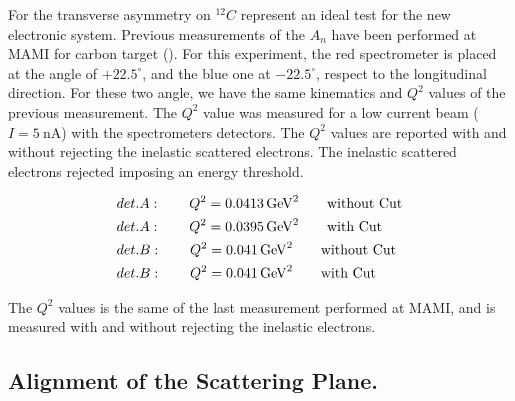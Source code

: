 For the transverse asymmetry on $^{12}C$ represent an ideal test for the new electronic system. Previous measurements of the $A_{n}$ have been performed at MAMI for carbon target (\cite{Esser:2018vdp}). For this experiment, the red spectrometer is placed at the angle of $+22.5^{\circ}$, and the blue one at $-22.5^{\circ}$, respect to the longitudinal direction.
For these two angle, we have the same kinematics and $Q^{2}$ values of the previous measurement. The $Q^{2}$ value was measured for a low current beam ($I = \SI{5}{\nano \ampere}$) with the spectrometers detectors. The $Q^{2}$ values are reported with and without rejecting the inelastic scattered electrons. The inelastic scattered electrons rejected imposing an energy threshold. 

\begin{flushleft}
\begin{align*}
& det. A : \qquad Q^{2} = \SI{0.0413}{\giga \electronvolt \squared} \qquad \textnormal{without Cut} \\
& det. A : \qquad Q^{2} = \SI{0.0395}{\giga \electronvolt \squared} \qquad \textnormal{with Cut} \\
& det. B : \qquad Q^{2} = \SI{0.041}{\giga \electronvolt \squared} \qquad \textnormal{without Cut} \\
& det. B : \qquad Q^{2} = \SI{0.041}{\giga \electronvolt \squared} \qquad \textnormal{with Cut} 
\end{align*} 
\end{flushleft}

The $Q^{2}$ values is the same of the last measurement performed at MAMI, and is measured with and without rejecting the inelastic electrons. 

\subsection{Alignment of the Scattering Plane.}

